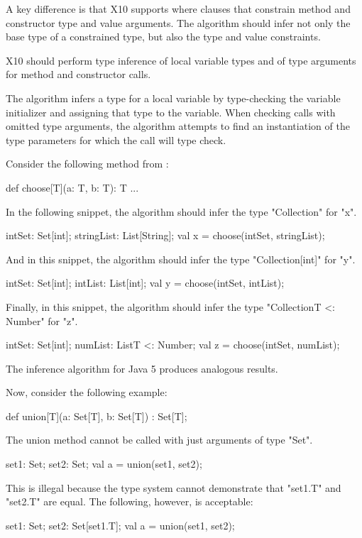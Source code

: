 \documentclass[nocopyrightspace,9pt]{sigplanconf}
\begin{document}
A key difference is that X10 supports where clauses that
constrain method and constructor type and value arguments.
The algorithm should infer not only the base type of a
constrained type, but also the type and value constraints.


X10 should perform type inference of local variable
types and of type arguments for method and constructor calls.%

The algorithm infers a type for a local variable by
type-checking the variable initializer and assigning
that type to the variable.
When checking calls with omitted type arguments,
the algorithm attempts to find an instantiation of the type
parameters for which the call will type check.
\fi

Consider the following method from \cite{adding-wildcards}:
\begin{xten}
def choose[T](a: T, b: T): T { ... }
\end{xten}
%
In the following snippet, the algorithm should infer the type
\xcd"Collection" for \xcd"x".
\begin{xten}
intSet: Set[int];
stringList: List[String];
val x = choose(intSet, stringList);
\end{xten}
%
And in this snippet, the algorithm should infer the type
\xcd"Collection[int]" for \xcd"y".
\begin{xten}
intSet: Set[int];
intList: List[int];
val y = choose(intSet, intList);
\end{xten}
%
Finally, in this snippet, the algorithm should infer the type
\xcd"Collection{T <: Number}" for \xcd"z".
\begin{xten}
intSet: Set[int];
numList: List{T <: Number};
val z = choose(intSet, numList);
\end{xten}
The inference algorithm for Java 5 produces analogous results.

Now, consider the following example:
\begin{xten}
def union[T](a: Set[T], b: Set[T]) : Set[T];
\end{xten}
The union method cannot be called with just arguments of type \xcd"Set".
\begin{xten}
set1: Set;
set2: Set;
val a = union(set1, set2);
\end{xten}
This is illegal because the type system cannot demonstrate that
\xcd"set1.T" and \xcd"set2.T" are equal.
The following, however, is acceptable:
\begin{xten}
set1: Set;
set2: Set[set1.T];
val a = union(set1, set2);
\end{xten}
\end{document}
